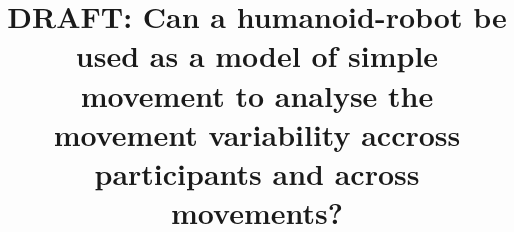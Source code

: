 \documentclass{sig-alternate-05-2015}
\begin{document}






%

\title{DRAFT: Can a humanoid-robot 
be used as a model of simple movement to analyse the movement variability 
accross participants and across movements?}


%
%
%
%
%
\end{document}
